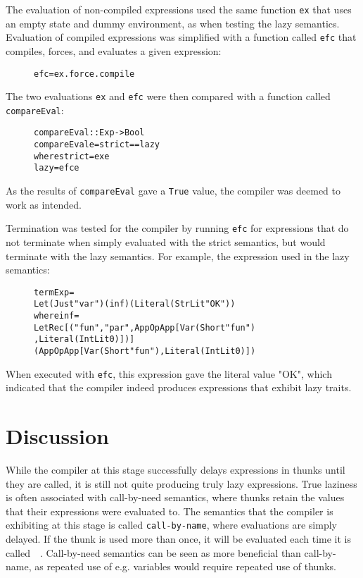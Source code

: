 The evaluation of non-compiled
expressions used the same function \texttt{ex} that uses an empty state and
dummy environment, as when testing the lazy semantics. Evaluation of
compiled expressions was simplified with a function called \texttt{efc} that
compiles, forces, and evaluates a given expression:

\begin{figure}[H]
\begin{alltt}
  efc = ex . force . compile
\end{alltt}
\end{figure}

\noindent The two evaluations \texttt{ex} and \texttt{efc} were then compared
with a function called \texttt{compareEval}:

\begin{figure}[H]
\begin{alltt}
  compareEval :: Exp -> Bool
  compareEval e = strict == lazy
    where strict = ex e
          lazy   = efc e
\end{alltt}
\end{figure}

\noindent As the results of \texttt{compareEval} gave a \texttt{True} value,
the compiler was deemed to work as intended.

Termination was tested for the compiler by running \texttt{efc} for expressions
that do not terminate when simply evaluated with the strict semantics, but would
terminate with the lazy semantics. For example, the expression used in the lazy
semantics:

\begin{figure}[H]
\begin{alltt}
  termExp =
    Let (Just "var") (inf) (Literal (StrLit "OK"))
    where inf =
      LetRec [("fun", "par", App OpApp [Var (Short "fun")
                                       ,Literal (IntLit 0)])]
      (App OpApp [Var (Short "fun"), Literal (IntLit 0)])
\end{alltt}
\end{figure}

\noindent When executed with \texttt{efc}, this expression gave the literal
value "OK", which indicated that the compiler indeed produces expressions that
exhibit lazy traits.

\section{Discussion}
While the compiler at this stage successfully delays expressions in thunks
until they are called, it is still not quite producing truly lazy expressions.
True laziness is often associated with call-by-need semantics, where thunks
retain the values that their expressions were evaluated to. The semantics that
the compiler is exhibiting at this stage is called \texttt{call-by-name}, where
evaluations are simply delayed. If the thunk is used more than once, it will
be evaluated each time it is called~\cite{DragonBook}~\cite{pltbook}.
Call-by-need semantics can be seen as more beneficial than call-by-name, as
repeated use of e.g. variables would require repeated use of thunks.


